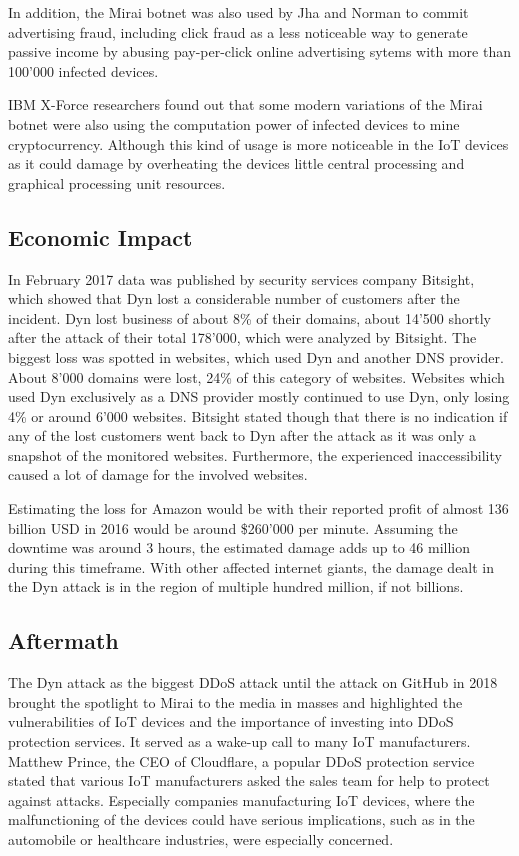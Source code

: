 In addition, the Mirai botnet was also used by Jha and Norman to commit advertising fraud, including click fraud as a less noticeable way to generate passive income by abusing pay-per-click online advertising sytems with more than 100'000 infected devices.

IBM X-Force researchers found out that some modern variations of the Mirai botnet were also using the computation power of infected devices to mine cryptocurrency. Although this kind of usage is more noticeable in the IoT devices as it could damage by overheating the devices little central processing and graphical processing unit resources.

	\subsection{Economic Impact}
	In February 2017 data was published by security services company Bitsight, which showed that Dyn lost a considerable number of customers after the incident. Dyn lost business of about 8\% of their domains, about 14'500 shortly after the attack of their total 178'000, which were analyzed by Bitsight. 
The biggest loss was spotted in websites, which used Dyn and another DNS provider. About 8'000 domains were lost, 24\% of this category of websites. Websites which used Dyn exclusively as a DNS provider mostly continued to use Dyn, only losing 4\% or around 6'000 websites. Bitsight stated though that there is no indication if any of the lost customers went back to Dyn after the attack as it was only a snapshot of the monitored websites.
Furthermore, the experienced inaccessibility caused a lot of damage for the involved websites. 

Estimating the loss for Amazon would be with their reported profit of almost 136 billion USD in 2016 would be around \$260'000 per minute. Assuming the downtime was around 3 hours, the estimated damage adds up to 46 million during this timeframe. With other affected internet giants, the damage dealt in the Dyn attack is in the region of multiple hundred million, if not billions.

	\subsection{Aftermath}
	The Dyn attack as the biggest DDoS attack until the attack on GitHub in 2018 brought the spotlight to Mirai to the media in masses and highlighted the vulnerabilities of IoT devices and the importance of investing into DDoS protection services. It served as a wake-up call to many IoT manufacturers. Matthew Prince, the CEO of Cloudflare, a popular DDoS protection service stated that various IoT manufacturers asked the sales team for help to protect against attacks. Especially companies manufacturing IoT devices, where the malfunctioning of the devices could have serious implications, such as in the automobile or healthcare industries, were especially concerned.
	

